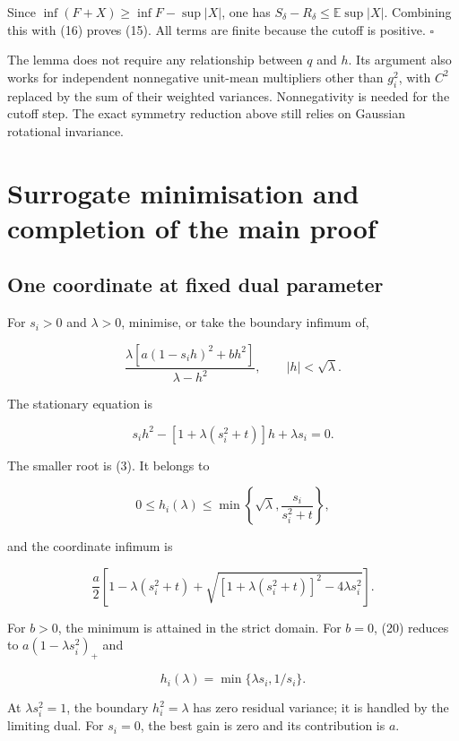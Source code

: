 \documentclass[11pt,a4paper]{article}
\begin{document}
Since \(\inf(F+X)\ge\inf F-\sup|X|\), one has
\(S_\delta-R_\delta\le\mathbb E\sup|X|\). Combining this with (16)
proves (15). All terms are finite because the cutoff is positive.
\(\square\)

The lemma does not require any relationship between \(q\) and \(h\). Its
argument also works for independent nonnegative unit-mean multipliers
other than \(g_i^2\), with \(C^2\) replaced by the sum of their weighted
variances. Nonnegativity is needed for the cutoff step. The exact
symmetry reduction above still relies on Gaussian rotational invariance.

\hypertarget{surrogate-minimisation-and-completion-of-the-main-proof}{%
\section{Surrogate minimisation and completion of the main
proof}\label{surrogate-minimisation-and-completion-of-the-main-proof}}

\hypertarget{one-coordinate-at-fixed-dual-parameter}{%
\subsection{One coordinate at fixed dual
parameter}\label{one-coordinate-at-fixed-dual-parameter}}

For \(s_i>0\) and \(\lambda>0\), minimise, or take the boundary infimum
of,

\[
\frac{\lambda[a(1-s_i h)^2+b h^2]}{\lambda-h^2},
\qquad |h|<\sqrt\lambda.
\tag{18}
\]

The stationary equation is

\[
s_i h^2-[1+\lambda(s_i^2+t)]h+\lambda s_i=0.
\tag{19}
\]

The smaller root is (3). It belongs to

\[
0\le h_i(\lambda)\le
\min\left\{\sqrt\lambda,\frac{s_i}{s_i^2+t}\right\},
\]

and the coordinate infimum is

\[
\frac a2\left[
1-\lambda(s_i^2+t)
+\sqrt{[1+\lambda(s_i^2+t)]^2-4\lambda s_i^2}
\right].
\tag{20}
\]

For \(b>0\), the minimum is attained in the strict domain. For \(b=0\),
(20) reduces to \(a(1-\lambda s_i^2)_+\) and

\[
h_i(\lambda)=\min\{\lambda s_i,1/s_i\}.
\tag{21}
\]

At \(\lambda s_i^2=1\), the boundary \(h_i^2=\lambda\) has zero residual
variance; it is handled by the limiting dual. For \(s_i=0\), the best
gain is zero and its contribution is \(a\).
\end{document}
